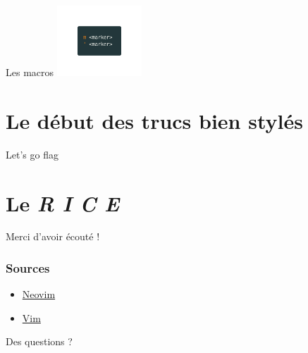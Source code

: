 \documentclass[10pt]{beamer}
\begin{document}
	\begin{frame}{Les macros}
		\center
		\includegraphics[height=100]{img/markers.png}
	\end{frame}

\section{Le début des trucs bien stylés}
	\begin{frame}{Let's go flag}
	\end{frame}
	
\section{Le \textit{R I C E}}

\begin{appendix}

	\begin{frame}[standout]
		Merci d'avoir écouté !
	\end{frame}

	\begin{frame}
		\frametitle{Sources}
		\begin{itemize}
			\item \href{https://neovim.io/}{Neovim}
			\item \href{https://www.vim.org}{Vim}
		\end{itemize}
	\end{frame}

	\begin{frame}[standout]
		Des questions ?
	\end{frame}

\end{appendix}
\end{document}
